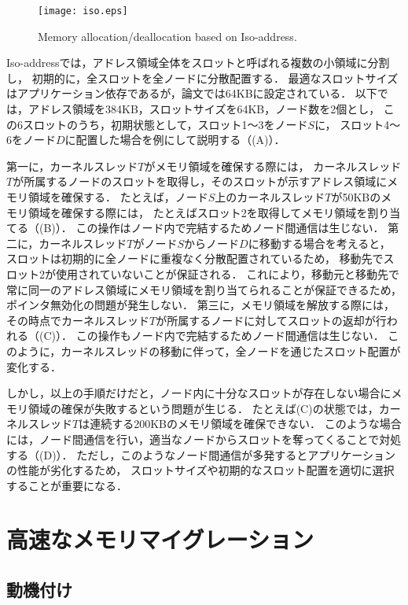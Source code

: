 \documentclass[10pt]{jsarticle}
\begin{document}
\begin{figure}
  \centering
  \texttt{[image: iso.eps]}
  \caption{Memory allocation/deallocation based on Iso-address.}
  \label{fig:iso}
\end{figure}

Iso-addressでは，アドレス領域全体をスロットと呼ばれる複数の小領域に分割し，
初期的に，全スロットを全ノードに分散配置する．
最適なスロットサイズはアプリケーション依存であるが，論文\cite{t4}では64KBに設定されている．
以下では，アドレス領域を384KB，スロットサイズを64KB，ノード数を2個とし，
この6スロットのうち，初期状態として，スロット1〜3をノード$S$に，
スロット4〜6をノード$D$に配置した場合を例にして説明する（(A)）．

第一に，カーネルスレッド$T$がメモリ領域を確保する際には，
カーネルスレッド$T$が所属するノードのスロットを取得し，そのスロットが示すアドレス領域にメモリ領域を確保する．
たとえば，ノード$S$上のカーネルスレッド$T$が50KBのメモリ領域を確保する際には，
たとえばスロット2を取得してメモリ領域を割り当てる（(B)）．
この操作はノード内で完結するためノード間通信は生じない．
第二に，カーネルスレッド$T$がノード$S$からノード$D$に移動する場合を考えると，
スロットは初期的に全ノードに重複なく分散配置されているため，
移動先でスロット2が使用されていないことが保証される．
これにより，移動元と移動先で常に同一のアドレス領域にメモリ領域を割り当てられることが保証できるため，ポインタ無効化の問題が発生しない．
第三に，メモリ領域を解放する際には，
その時点でカーネルスレッド$T$が所属するノードに対してスロットの返却が行われる（(C)）．
この操作もノード内で完結するためノード間通信は生じない．
このように，カーネルスレッドの移動に伴って，全ノードを通じたスロット配置が変化する．

しかし，以上の手順だけだと，ノード内に十分なスロットが存在しない場合にメモリ領域の確保が失敗するという問題が生じる．
たとえば(C)の状態では，カーネルスレッド$T$は連続する200KBのメモリ領域を確保できない．
このような場合には，ノード間通信を行い，適当なノードからスロットを奪ってくることで対処する（(D)）．
ただし，このようなノード間通信が多発するとアプリケーションの性能が劣化するため，
スロットサイズや初期的なスロット配置を適切に選択することが重要になる．

\section{高速なメモリマイグレーション}
\label{sec:memory}

\subsection{動機付け}
\end{document}
